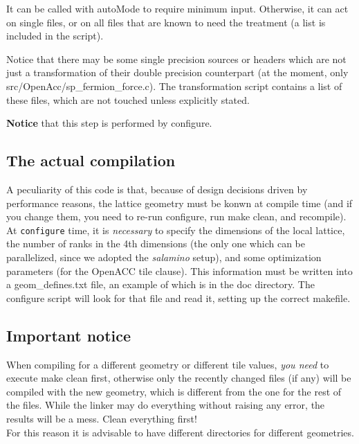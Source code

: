 It can be called with \textsf{ autoMode} to require minimum input. Otherwise, it can act on
single files, or on all files that are known to need the treatment (a list is included in the script).

Notice that there may be some single precision sources or headers which are not just a 
transformation of their double precision counterpart (at the moment, only 
\textsf{ src/OpenAcc/sp\_fermion\_force.c}). The transformation script contains a list
of these files, which are not touched unless explicitly stated.

{\bfseries Notice} that this step is performed by \textsf{ configure}.


\subsection{The actual compilation}

A peculiarity of this code is that, because of design decisions driven by 
performance reasons, the lattice geometry must be konwn at compile time (and 
if you change them, you need to re-run \textsf{ configure}, run \textsf{ make clean}, and recompile). 
At \verb|configure| time, it is \emph{necessary} to  specify the dimensions of the local lattice,
the number of ranks in the 4th dimensions (the only one which can be 
parallelized, since we adopted the \emph{salamino} setup), and some optimization parameters
(for the OpenACC  \textsf{ tile} clause). This information must be written into a 
\textsf{ geom\_defines.txt} file, an example of which is in the \textsf{ doc} directory.
The \textsf{ configure} script will look for that file and read it, setting up the correct makefile.

\subsection{Important notice}

When compiling for a different geometry or different \textsf{ tile values}, \emph{you need} to execute 
\textsf{ make clean} first, otherwise only the recently changed files  (if 
any) will be 
compiled with the new geometry, which is different from the one for the rest of 
the files. While the linker may do everything without raising any error, the results will be a 
mess. Clean everything first!\\

For this reason it is advisable to have different directories for different 
geometries.

